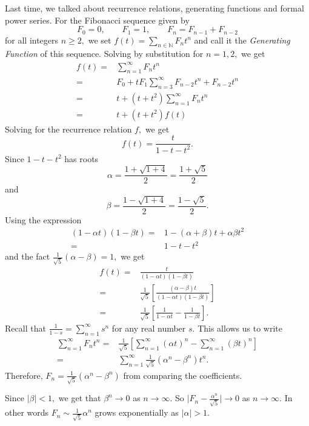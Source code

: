 

Last time, we talked about recurrence relations, generating functions and formal power series.
For the Fibonacci sequence given by
$$ F_0 = 0, \qquad F_1 = 1, \qquad F_n = F_{n-1} + F_{n-2}$$
for all integers $n \geq 2,$
we set $f(t) = \sum_{n \in \mathbb{N}}^{} F_n t^n$ and call it the \emph{Generating Function}
of this sequence.
Solving by substitution for $n=1,2,$ we get
\begin{align*}
	f(t) ={}& \sum_{n=1}^{\infty} F_n t^n \\
	={}& F_0 + t F_1 \sum_{n=3}^{\infty} F_{n-2} t^n + F_{n-2} t^n \\
	={}& t + (t + t^2) \sum_{n=1}^{\infty} F_{n} t^n \\
	={}& t + (t + t^2) f(t)
\end{align*}
Solving for the recurrence relation $f,$ we get
$$ f(t) =  \frac{t}{1 - t - t^2}.$$
Since $ 1 - t - t^2$ has roots 
$$\alpha = \frac{1 + \sqrt{1 + 4}}{2} = \frac{1 + \sqrt{5}}{2}$$ and 
$$\beta = \frac{1 - \sqrt{1 +4 }}{2} = \frac{1 - \sqrt{5}}{2}.$$ 
Using the expression
\begin{align*}
	( 1 - \alpha t)(1 - \beta t) ={}& 1 - (\alpha + \beta) t + \alpha \beta t^2\\
	={}& 1 - t - t^2 
\end{align*}
and the fact $ \frac{1}{\sqrt{5}}(\alpha - \beta) = 1,$ we get
\begin{align*}
	f(t) ={}& \frac{t}{(1 - \alpha t ) ( 1 - \beta t)} \\
	={}& \frac{1}{\sqrt{5}} \left[  \frac{( \alpha - \beta ) t}{
	(1 - \alpha t)(1 - \beta t) }\right] \\
	={}& \frac{1}{ \sqrt{5}} \left[ \frac{1}{1 - \alpha t} - \frac{1}{ 1 - \beta t} \right].
\end{align*}
Recall that $ \frac{1}{1-s} = \sum_{n=1}^{\infty} s ^n$ for any real number $s.$
This allows us to write
\begin{align*}
	\sum_{n=1}^{\infty} F_n t^n ={}& \frac{1}{\sqrt{5}} \left[ \sum_{n=1}^{\infty} 
	(\alpha t)^n - \sum_{n=1}^{\infty} ( \beta t)^n \right] \\
	={}& \sum_{n=1}^{\infty} \frac{1}{\sqrt{5}} \left( \alpha^n - \beta^n \right) t^n.
\end{align*}
Therefore, $F_n = \frac{1}{\sqrt{5}} \left( \alpha^n  -\beta^n \right)$
from comparing the coefficients.

Since $ \lvert  \beta \rvert < 1,$ we get that $ \beta^n \to 0$ as $ n \to \infty.$
So $ \lvert  F_n - \frac{\alpha^n}{\sqrt{5}} \rvert \to 0$ as $n \to \infty.$
In other words $F_n \sim \frac{1}{\sqrt{5}} \alpha^n$ grows exponentially as $ \lvert 
\alpha\rvert >1.$

